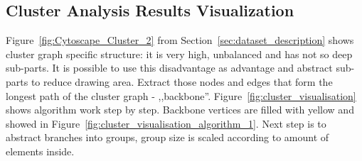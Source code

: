 \subsection{Cluster Analysis Results Visualization}
\label{sec:cluster}

Figure~\ref{fig:Cytoscape_Cluster_2} from Section~\ref{sec:dataset_description} shows cluster graph specific structure: it is very high, unbalanced and has not so deep sub-parts. It is possible to use this disadvantage as advantage and abstract sub-parts to reduce drawing area. Extract those nodes and edges that form the longest path of the cluster graph - ,,backbone''. Figure~\ref{fig:cluster_visualisation} shows algorithm work step by step. Backbone vertices are filled with yellow and showed in Figure~\ref{fig:cluster_visualisation_algorithm_1}. Next step is to abstract branches into groups, group size is scaled according to amount of elements inside.

